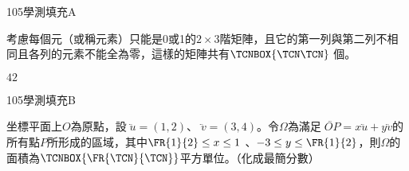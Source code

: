 \begin{QUESTIONS}
    \begin{QUESTION}
        \begin{ExamInfo}{105}{學測}{填充}{A}
        \end{ExamInfo}
        \begin{ExamAnsRateInfo}{22}{47}{16}{3}
        \end{ExamAnsRateInfo}
        \begin{QBODY}
            考慮每個元（或稱元素）只能是0或1的$2\times 3$階矩陣，且它的第一列與第二列不相同且各列的元素不能全為零，這樣的矩陣共有$\TCNBOX{\TCN\TCN}$ 個。
        \end{QBODY}
        \begin{QFROMS}
        \end{QFROMS}
        \begin{QTAGS}\end{QTAGS}
        \begin{QANS}
            $42$
        \end{QANS}
        \begin{QSOLLIST}
        \end{QSOLLIST}
        \begin{QEMPTYSPACE}
        \end{QEMPTYSPACE}
    \end{QUESTION}
    \begin{QUESTION}
        \begin{ExamInfo}{105}{學測}{填充}{B}
        \end{ExamInfo}
        \begin{ExamAnsRateInfo}{22}{54}{11}{1}
        \end{ExamAnsRateInfo}
        \begin{QBODY}
            坐標平面上$O$為原點，設$\lvec{u}$$=(1,2)$、$\lvec{v}=(3,4)$。令$\Omega $為滿足$\lvec{OP}=x\lvec{u}+y\lvec{v}$的所有點$P$所形成的區域，其中$\FR{1}{2}\le x\le 1\ $、$-3\le y\le \FR{1}{2}$，則$\Omega $的面積為$\TCNBOX{\FR{\TCN}{\TCN}}$平方單位。（化成最簡分數）
        \end{QBODY}
        \begin{QFROMS}
        \end{QFROMS}
        \begin{QTAGS}\end{QTAGS}
        \begin{QANS}

\end{QANS}
\end{QUESTION}
\end{QUESTIONS}
